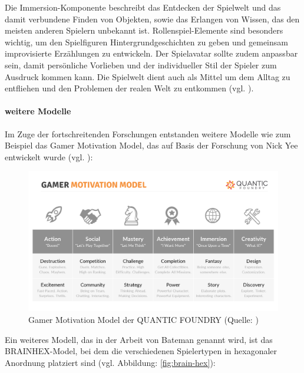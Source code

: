 Die Immersion-Komponente beschreibt das Entdecken der Spielwelt und das damit verbundene Finden von Objekten, sowie das Erlangen von Wissen, das den meisten anderen Spielern unbekannt ist. Rollenspiel-Elemente sind besonders wichtig, um den Spielfiguren Hintergrundgeschichten zu geben und gemeinsam improvisierte Erzählungen zu entwickeln. Der Spielavatar sollte zudem anpassbar sein, damit persönliche Vorlieben und der individueller Stil der Spieler zum Ausdruck kommen kann. Die Spielwelt dient auch als Mittel um dem Alltag zu entfliehen und den Problemen der realen Welt zu entkommen (vgl. \citealp[S. 6]{nick_yee_motivations_2006}).

\paragraph{weitere Modelle}
Im Zuge der fortschreitenden Forschungen entstanden weitere Modelle wie zum Beispiel das Gamer Motivation Model, das auf Basis der Forschung von Nick Yee entwickelt wurde (vgl. \citealp{institut_fur_ludologie_spielertypen_nodate}):

\begin{figure}[ht]
\centering
\includegraphics[width=1\linewidth]{content/pictures/gamer_motivations_model.png}
\caption{Gamer Motivation Model der QUANTIC FOUNDRY (Quelle: \citealp{quantic_foundry_quantic_2025})}
\label{fig:gamer_motivation_model}
\end{figure}

Ein weiteres Modell, das in der Arbeit von Bateman genannt wird, ist das BRAINHEX-Model, bei dem die verschiedenen Spielertypen in hexagonaler Anordnung platziert sind (vgl. Abbildung: \ref{fig:brain-hex}):

